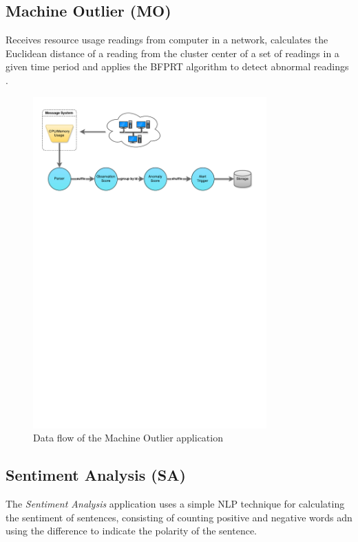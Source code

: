 \documentclass[ppgc,diss,english]{iiufrgs}
\begin{document}
\subsection{Machine Outlier (MO)}

Receives resource usage readings from computer in a network, calculates the Euclidean distance of a reading from the cluster center of a set of readings in a given time period and applies the BFPRT algorithm to detect abnormal readings \cite{yoon2007approach}.

\begin{figure}[!ht]
	\centering
	\includegraphics[width=0.8\textwidth]{images/apps/MachineOutlier.pdf}
	\caption{Data flow of the Machine Outlier application}
	\label{fig:app_machine_outlier}
\end{figure}

\subsection{Sentiment Analysis (SA)}

The \emph{Sentiment Analysis} application uses a simple NLP technique for calculating the sentiment of sentences, consisting of counting positive and negative words adn using the difference to indicate the polarity of the sentence.
\end{document}
